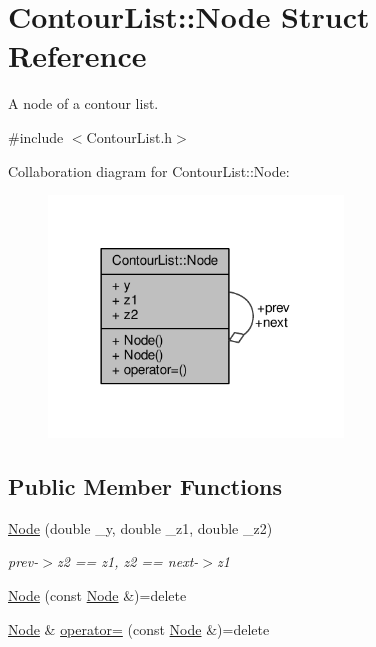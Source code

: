 \hypertarget{structContourList_1_1Node}{}\section{Contour\+List\+:\+:Node Struct Reference}
\label{structContourList_1_1Node}


A node of a contour list.  




{\ttfamily \#include $<$Contour\+List.\+h$>$}



Collaboration diagram for Contour\+List\+:\+:Node\+:\nopagebreak
\begin{figure}[H]
\begin{center}
\leavevmode
\includegraphics[width=222pt]{structContourList_1_1Node__coll__graph}
\end{center}
\end{figure}
\subsection*{Public Member Functions}
\begin{DoxyCompactItemize}
\item 
\hyperlink{structContourList_1_1Node_ac4e773feed1974871bd67d8d9575d3b9}{Node} (double \+\_\+y, double \+\_\+z1, double \+\_\+z2)
\begin{DoxyCompactList}\small\item\em prev-\/$>$z2 == z1, z2 == next-\/$>$z1 \end{DoxyCompactList}\item 
\hyperlink{structContourList_1_1Node_aa5a6173b45499956934fea3f0f988937}{Node} (const \hyperlink{structContourList_1_1Node}{Node} \&)=delete
\item 
\hyperlink{structContourList_1_1Node}{Node} \& \hyperlink{structContourList_1_1Node_a034f1203c181859eff8925b7f3549f37}{operator=} (const \hyperlink{structContourList_1_1Node}{Node} \&)=delete
\end{DoxyCompactItemize}
